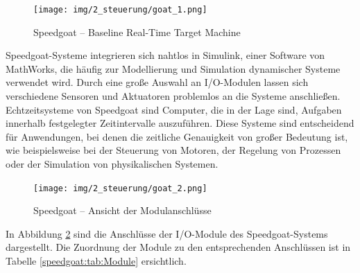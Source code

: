 \pagebreak[1]
\begin{figure}[!ht]
	\begin{center}
		\texttt{[image: img/2\_steuerung/goat\_1.png]}
		\caption{Speedgoat – Baseline Real-Time Target Machine}
		\label{speedgoat:img:steuerung_goat}
	\end{center}
\end{figure}
\pagebreak[1]

Speedgoat-Systeme integrieren sich nahtlos in Simulink, einer Software von MathWorks, die häufig zur Modellierung und Simulation dynamischer Systeme verwendet wird. Durch eine große Auswahl an I/O-Modulen lassen sich verschiedene Sensoren und Aktuatoren problemlos an die Systeme anschließen.
Echtzeitsysteme von Speedgoat sind Computer, die in der Lage sind, Aufgaben innerhalb festgelegter Zeitintervalle auszuführen. Diese Systeme sind entscheidend für Anwendungen, bei denen die zeitliche Genauigkeit von großer Bedeutung ist, wie beispielsweise bei der Steuerung von Motoren, der Regelung von Prozessen oder der Simulation von physikalischen Systemen.


\pagebreak[1]
\begin{figure}[!ht]
	\begin{center}
		\texttt{[image: img/2\_steuerung/goat\_2.png]}
		\caption{Speedgoat – Ansicht der Modulanschlüsse}
		\label{speedgoat:img:Modulanschlüsse}
	\end{center}
\end{figure}
\pagebreak[1]
In Abbildung \ref{speedgoat:img:Modulanschlüsse} sind die Anschlüsse der I/O-Module des Speedgoat-Systems dargestellt. Die Zuordnung der Module zu den entsprechenden Anschlüssen ist in Tabelle \ref{speedgoat:tab:Module} ersichtlich.

